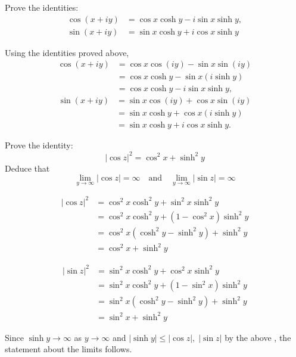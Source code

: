 \documentclass[12pt]{exam}
\begin{document}
\begin{questions}
    \question
    Prove the identities:
    \begin{align*}
        \cos(x+iy) &= \cos x\cosh y - i\sin x\sinh y,\\
        \sin(x+iy) &= \sin x\cosh y + i\cos x\sinh y
    \end{align*}

    \begin{solution}
        Using the identities proved above,
        \begin{align*}
            \cos(x+iy) &= \cos x\cos(iy) - \sin x\sin(iy)\\
            &=\cos x\cosh y - \sin x(i\sinh y)\\
            &=\cos x\cosh y - i\sin x\sinh y,
        \end{align*}
        \begin{align*}
            \sin(x+iy) &= \sin x\cos(iy) + \cos x\sin(iy)\\
            &=\sin x\cosh y + \cos x(i\sinh y)\\
            &=\sin x\cosh y + i\cos x\sinh y.
        \end{align*}
    \end{solution}



    \question
    Prove the identity:
    \[
        |\cos z|^2 = \cos^2 x + \sinh^2 y
    \]
    Deduce that
    \[
        \lim_{y\to\infty} |\cos z| = \infty\quad\text{and}\quad
        \lim_{y\to\infty} |\sin z| = \infty
    \]
    \begin{solution}
        \begin{align*}
        |\cos z|^2 &= \cos^2 x\cosh^2 y + \sin^2 x\sinh^2 y\\
        &=  \cos^2 x\cosh^2 y + (1-\cos^2 x)\sinh^2 y\\
        &= \cos^2x(\cosh^2 y - \sinh^2 y) + \sinh^2 y\\
        &= \cos^2x + \sinh^2 y
    \end{align*}

    \begin{align*}
        |\sin z|^2 &= \sin^2 x\cosh^2 y + \cos^2 x\sinh^2 y\\
        &=  \sin^2 x\cosh^2 y + (1-\sin^2 x)\sinh^2 y\\
        &= \sin^2x(\cosh^2 y - \sinh^2 y) + \sinh^2 y\\
        &= \sin^2x + \sinh^2 y
    \end{align*}

    Since $\sinh y\to\infty$ as $y\to\infty$ and $|\sinh y|\leq |\cos z|,\;|\sin z|$ by the above ,
    the statement about the limits follows.
    \end{solution}




\end{questions}
\end{document}
